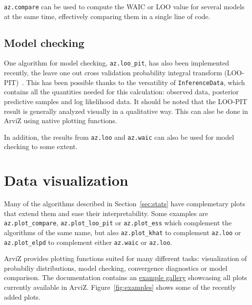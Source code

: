 \documentclass[anonymous=false, %
               format=acmsmall, %
               review=true, %
               screen=true, %
               nonacm=true]{acmart}
\begin{document}
\texttt{az.compare} can be used to compute the WAIC or LOO value for several
models at the same time, effectively comparing them in a single line of code.

\subsection{Model checking}
One algorithm for model checking, \texttt{az.loo\_pit}, has also been implemented
recently, the leave
one out cross validation probability integral transform
(LOO-PIT)~\cite{gabry2019visualization}. This has been possible thanks to the
versatility of \texttt{InferenceData}, which contains all the quantities
needed for this calculation: observed data, posterior predictive samples and
log likelihood data. It should be noted that the LOO-PIT result is generally
analyzed visually in a qualitative way. This can alse be done in ArviZ using
native plotting functions.

In addition, the results from \texttt{az.loo} and
\texttt{az.waic} can also be used for model checking to some extent.

\section{Data visualization}\label{sec:plots}
Many of the algorithms described in Section~\ref{sec:stats} have complemetary
plots that extend them and ease their interpretability. Some
examples are \texttt{az.plot\_compare}, \texttt{az.plot\_loo\_pit} or
\texttt{az.plot\_ess} which complement the algorithms of the same name, but
also \texttt{az.plot\_khat} to complement \texttt{az.loo} or
\texttt{az.plot\_elpd} to complement either \texttt{az.waic} or
\texttt{az.loo}.

ArviZ provides plotting functions suited for many different tasks:
visualization of probabiliy distributions, model checking, convergence
diagnostics or model comparison. The
documentation contains an
\href{https://arviz-devs.github.io/arviz/examples/index.html}{example gallery}
showcasing all plots currently available in ArviZ. Figure~\ref{fig:examples}
shows some of the recently added plots.
\end{document}
